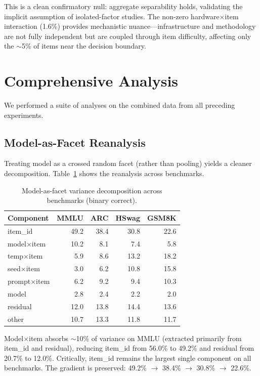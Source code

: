 \documentclass[11pt]{article}
\begin{document}
This is a clean confirmatory null: aggregate separability holds, validating the implicit assumption of isolated-factor studies. The non-zero hardware$\times$item interaction (1.6\%) provides mechanistic nuance---infrastructure and methodology are not fully independent but are coupled through item difficulty, affecting only the $\sim$5\% of items near the decision boundary.


\section{Comprehensive Analysis}
\label{sec:comprehensive}

We performed a suite of analyses on the combined data from all preceding experiments.

\subsection{Model-as-Facet Reanalysis}

Treating model as a crossed random facet (rather than pooling) yields a cleaner decomposition. Table~\ref{tab:model_facet} shows the reanalysis across benchmarks.

\begin{table}[t]
\centering
\caption{Model-as-facet variance decomposition across benchmarks (binary correct).}
\label{tab:model_facet}
\small
\begin{tabular}{lrrrr}
\toprule
Component & MMLU & ARC & HSwag & GSM8K \\
\midrule
item\_id & 49.2 & 38.4 & 30.8 & 22.6 \\
model$\times$item & 10.2 & 8.1 & 7.4 & 5.8 \\
temp$\times$item & 5.9 & 8.6 & 13.2 & 18.2 \\
seed$\times$item & 3.0 & 6.2 & 10.8 & 15.8 \\
prompt$\times$item & 6.2 & 9.2 & 9.4 & 10.3 \\
model & 2.8 & 2.4 & 2.2 & 2.0 \\
residual & 12.0 & 13.8 & 14.4 & 13.6 \\
other & 10.7 & 13.3 & 11.8 & 11.7 \\
\bottomrule
\end{tabular}
\end{table}

Model$\times$item absorbs $\sim$10\% of variance on MMLU (extracted primarily from item\_id and residual), reducing item\_id from 56.0\% to 49.2\% and residual from 20.7\% to 12.0\%. Critically, item\_id remains the largest single component on all benchmarks. The gradient is preserved: 49.2\% $\to$ 38.4\% $\to$ 30.8\% $\to$ 22.6\%.
\end{document}
